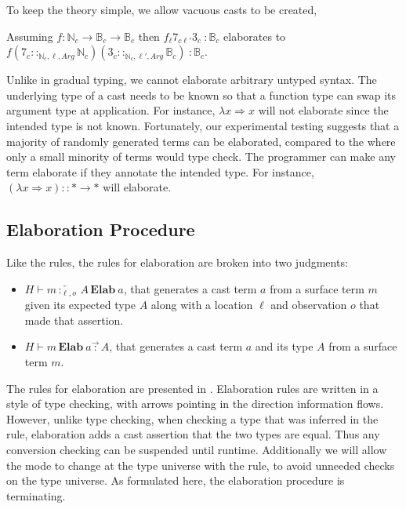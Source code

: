 To keep the theory simple, we allow vacuous casts to be created,
\begin{example}
Assuming $f:\mathbb{N}_c \rightarrow\mathbb{B}_c \rightarrow\mathbb{B}_c$ then $f_{\ell}7_{c\ell'}3_c \ :\mathbb{B}_c $ elaborates to $f\left(7_c ::_{\mathbb{N}_c,\ell,Arg}\mathbb{N}_c \right)\left(3_c ::_{\mathbb{N}_c,\ell',Arg}\mathbb{B}_c \right)\ :\mathbb{B}_c$.
\end{example}


Unlike in gradual typing, we cannot elaborate arbitrary untyped syntax.
The underlying type of a cast needs to be known so that a function type can swap its argument type at application. 
For instance, $\lambda x\Rightarrow x$ will not elaborate since the intended type is not known.
Fortunately, our experimental testing suggests that a majority of randomly generated terms can be elaborated, compared to the \slang{} where only a small minority of terms would type check.
The programmer can make any term elaborate if they annotate the intended type.
For instance, $\left(\lambda x\Rightarrow x\right)::*\rightarrow*$ will elaborate.

\subsection{Elaboration Procedure}

Like the \bidir{} rules, the rules for elaboration are broken into two judgments:
\begin{itemize}
\item $H\vdash m\overleftarrow{\,:_{\ell,o}\,}A\,\textbf{Elab}\ a$, that generates a cast term $a$ from a surface term $m$ given its expected type $A$ along with a location $\ell$ and observation $o$ that made that assertion.
\item $H\vdash m\,\textbf{Elab}\ a\overrightarrow{\,:\,}A$, that generates a cast term $a$ and its type $A$ from a surface term $m$.
\end{itemize}
The rules for elaboration are presented in .
Elaboration rules are written in a style of \bidir{} type checking, with arrows pointing in the direction information flows.
However, unlike \bidir{} type checking, when checking a type that was inferred in the  rule, elaboration adds a cast assertion that the two types are equal.
Thus any conversion checking can be suspended until runtime.
Additionally we will allow the mode to change at the type universe with the  rule, to avoid unneeded checks on the type universe.
As formulated here, the elaboration procedure is terminating.

